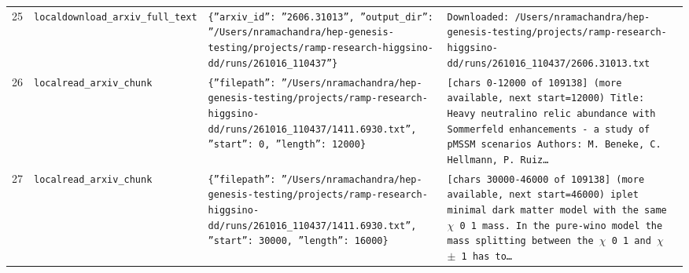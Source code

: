 \documentclass[11pt,a4paper]{article}
\begin{document}
\begin{longtable}{@{}p{}p{}p{}p{}@{}}
25 & \texttt{local}\newline\texttt{download\_\allowbreak{}arxiv\_\allowbreak{}full\_\allowbreak{}text} & \texttt{\{''arxiv\_\allowbreak{}id'':\allowbreak{} ''2606.31013'',\allowbreak{} ''output\_\allowbreak{}dir'':\allowbreak{} ''/\allowbreak{}Users/\allowbreak{}nramachandra/\allowbreak{}hep-genesis-testing/\allowbreak{}projects/\allowbreak{}ramp-research-higgsino-dd/\allowbreak{}runs/\allowbreak{}261016\_\allowbreak{}110437''\}\allowbreak{}} & \texttt{Downloaded:\allowbreak{} /\allowbreak{}Users/\allowbreak{}nramachandra/\allowbreak{}hep-genesis-testing/\allowbreak{}projects/\allowbreak{}ramp-research-higgsino-dd/\allowbreak{}runs/\allowbreak{}261016\_\allowbreak{}110437/\allowbreak{}2606.31013.txt} \\
26 & \texttt{local}\newline\texttt{read\_\allowbreak{}arxiv\_\allowbreak{}chunk} & \texttt{\{''filepath'':\allowbreak{} ''/\allowbreak{}Users/\allowbreak{}nramachandra/\allowbreak{}hep-genesis-testing/\allowbreak{}projects/\allowbreak{}ramp-research-higgsino-dd/\allowbreak{}runs/\allowbreak{}261016\_\allowbreak{}110437/\allowbreak{}1411.6930.txt'',\allowbreak{} ''start'':\allowbreak{} 0,\allowbreak{} ''length'':\allowbreak{} 12000\}\allowbreak{}} & \texttt{[chars 0-12000 of 109138]\allowbreak{} (more available,\allowbreak{} next start=\allowbreak{}12000)\allowbreak{}  Title:\allowbreak{} Heavy neutralino relic abundance with Sommerfeld enhancements - a study of pMSSM scenarios Authors:\allowbreak{} M. Beneke,\allowbreak{} C. Hellmann,\allowbreak{} P. Ruiz\ldots{}\allowbreak{}} \\
27 & \texttt{local}\newline\texttt{read\_\allowbreak{}arxiv\_\allowbreak{}chunk} & \texttt{\{''filepath'':\allowbreak{} ''/\allowbreak{}Users/\allowbreak{}nramachandra/\allowbreak{}hep-genesis-testing/\allowbreak{}projects/\allowbreak{}ramp-research-higgsino-dd/\allowbreak{}runs/\allowbreak{}261016\_\allowbreak{}110437/\allowbreak{}1411.6930.txt'',\allowbreak{} ''start'':\allowbreak{} 30000,\allowbreak{} ''length'':\allowbreak{} 16000\}\allowbreak{}} & \texttt{[chars 30000-46000 of 109138]\allowbreak{} (more available,\allowbreak{} next start=\allowbreak{}46000)\allowbreak{}  iplet minimal dark matter model with the same $\chi$ 0 1 mass. In the pure-wino model the mass splitting between the $\chi$ 0 1 and $\chi$ $\pm$ 1 has to\ldots{}\allowbreak{}} \\

\end{longtable}
\end{document}
